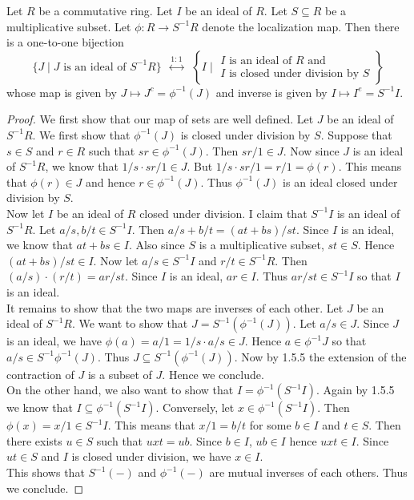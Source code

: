 \documentclass[a4paper]{article}
\begin{document}
\begin{thm}{}{} Let $R$ be a commutative ring. Let $I$ be an ideal of $R$. Let $S\subseteq R$ be a multiplicative subset. Let $\phi:R\to S^{-1}R$ denote the localization map. Then there is a one-to-one bijection $$\{J\;|\;J\text{ is an ideal of }S^{-1}R\}\;\;\overset{1:1}{\longleftrightarrow}\;\;\left\{I\;|\;\substack{I\text{ is an ideal of }R\text{ and }\\I\text{ is closed under division by }S}\right\}$$ whose map is given by $J\mapsto J^c=\phi^{-1}(J)$ and inverse is given by $I\mapsto I^e=S^{-1}I$. 
\begin{proof}
We first show that our map of sets are well defined. Let $J$ be an ideal of $S^{-1}R$. We first show that $\phi^{-1}(J)$ is closed under division by $S$. Suppose that $s\in S$ and $r\in R$ such that $sr\in\phi^{-1}(J)$. Then $sr/1\in J$. Now since $J$ is an ideal of $S^{-1}R$, we know that $1/s\cdot sr/1\in J$. But $1/s\cdot sr/1=r/1=\phi(r)$. This means that $\phi(r)\in J$ and hence $r\in\phi^{-1}(J)$. Thus $\phi^{-1}(J)$ is an ideal closed under division by $S$. \\

Now let $I$ be an ideal of $R$ closed under division. I claim that $S^{-1}I$ is an ideal of $S^{-1}R$. Let $a/s,b/t\in S^{-1}I$. Then $a/s+b/t=(at+bs)/st$. Since $I$ is an ideal, we know that $at+bs\in I$. Also since $S$ is a multiplicative subset, $st\in S$. Hence $(at+bs)/st\in I$. Now let $a/s\in S^{-1}I$ and $r/t\in S^{-1}R$. Then $(a/s)\cdot(r/t)=ar/st$. Since $I$ is an ideal, $ar\in I$. Thus $ar/st\in S^{-1}I$ so that $I$ is an ideal. \\

It remains to show that the two maps are inverses of each other. Let $J$ be an ideal of $S^{-1}R$. We want to show that $J=S^{-1}(\phi^{-1}(J))$. Let $a/s\in J$. Since $J$ is an ideal, we have $\phi(a)=a/1=1/s\cdot a/s\in J$. Hence $a\in\phi^{-1}J$ so that $a/s\in S^{-1}\phi^{-1}(J)$. Thus $J\subseteq S^{-1}(\phi^{-1}(J))$. Now by 1.5.5 the extension of the contraction of $J$ is a subset of $J$. Hence we conclude. \\

On the other hand, we also want to show that $I=\phi^{-1}(S^{-1}I)$. Again by 1.5.5 we know that $I\subseteq\phi^{-1}(S^{-1}I)$. Conversely, let $x\in\phi^{-1}(S^{-1}I)$. Then $\phi(x)=x/1\in S^{-1}I$. This means that $x/1=b/t$ for some $b\in I$ and $t\in S$. Then there exists $u\in S$ such that $uxt=ub$. Since $b\in I$, $ub\in I$ hence $uxt\in I$. Since $ut\in S$ and $I$ is closed under division, we have $x\in I$. \\

This shows that $S^{-1}(-)$ and $\phi^{-1}(-)$ are mutual inverses of each others. Thus we conclude. 
\end{proof}
\end{thm}
\end{document}
